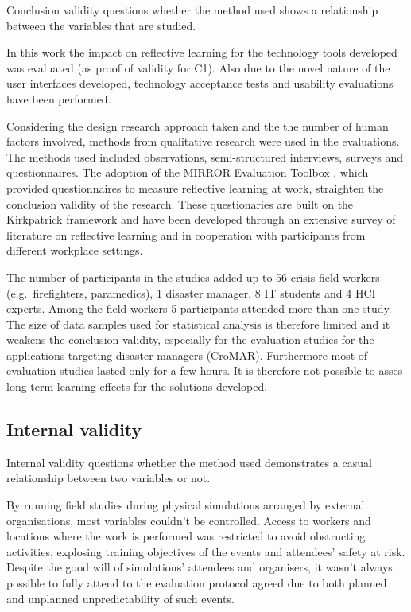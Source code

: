 Conclusion validity questions whether the method used shows a relationship between the variables that are studied.

In this work the impact on reflective learning for the technology tools developed was evaluated (as proof of validity for C1). Also due to the novel nature of the user interfaces developed, technology acceptance tests and usability evaluations have been performed.

Considering the design research approach taken and the the number of human factors involved, methods from qualitative research were used in the evaluations. The methods used included observations, semi-structured interviews, surveys and questionnaires. The adoption of the MIRROR Evaluation Toolbox \autocite{Renner:v4nLmwOk}, which provided questionnaires to measure reflective learning at work, straighten the conclusion validity of the research. These questionaries are built on the Kirkpatrick framework \autocite{kirkpatrick2009evaluating} and have been developed through an extensive survey of literature on reflective learning and in cooperation with participants from different workplace settings.

The number of participants in the studies added up to 56 crisis field workers (e.g.~firefighters, paramedics), 1 disaster manager, 8 IT students and 4 HCI experts. Among the field workers 5 participants attended more than one study. The size of data samples used for statistical analysis is therefore limited and it weakens the conclusion validity, especially for the evaluation studies for the applications targeting disaster managers (CroMAR). Furthermore most of evaluation studies lasted only for a few hours. It is therefore not possible to asses long-term learning effects for the solutions developed.

\subsection{Internal validity}\label{internal-validity}

Internal validity questions whether the method used demonstrates a casual relationship between two variables or not.

By running field studies during physical simulations arranged by external organisations, most variables couldn't be controlled. Access to workers and locations where the work is performed was restricted to avoid obstructing activities, explosing training objectives of the events and attendees' safety at risk. Despite the good will of simulations' attendees and organisers, it wasn't always possible to fully attend to the evaluation protocol agreed due to both planned and unplanned unpredictability of such events.

